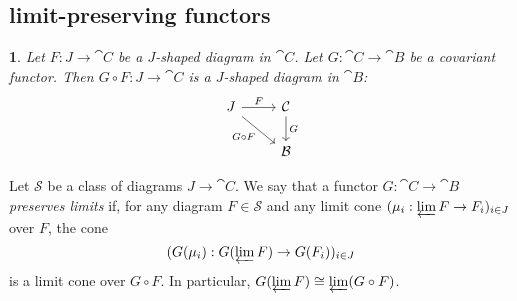 \documentclass[12pt]{article}
\newtheorem{para}[theorem]{}
\begin{document}
\subsection{limit-preserving functors} %

\begin{para}
	Let $F:J\to \cat{C}$ be a $J$-shaped diagram in $\cat{C}$. Let $G:\cat{C}\to\cat{B}$ be a covariant functor. Then $G\circ F:J\to \cat{C}$ is a $J$-shaped diagram in $\cat{B}$:  
	\begin{equation*}
\begin{tikzcd}
J \arrow[r, "F"] \arrow[rd, "G\circ F"'] & \mathcal{C} \arrow[d, "G"] \\
                                         & \mathcal{B}               
\end{tikzcd}
	\end{equation*}
\end{para}

\begin{definition}
	Let $\mathcal{S}$ be a class of diagrams $J\to\cat{C}$. We say that a functor $G:\cat{C}\to\cat{B}$ \emph{preserves limits} if, for any diagram $F\in\mathcal{S}$ and any limit cone $(\mu_i:\varprojlim F\to F_i)_{i\in J}$ over $F$, the cone 
	\begin{equation*}
		(G(\mu_i): G(\varprojlim F)\to G(F_i))_{i\in J}
	\end{equation*}
	is a limit cone over $G\circ F$. In particular, $G(\varprojlim F)\cong \varprojlim (G\circ F)$.
\end{definition}
\end{document}
